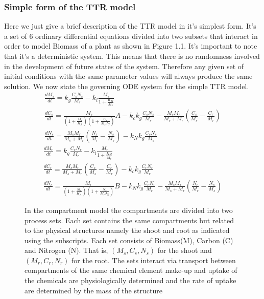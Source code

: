 \documentclass[paper=a4, fontsize=11pt]{scrartcl}
\numberwithin{equation}{section}		%
\numberwithin{figure}{section}			%
\numberwithin{table}{section}				%
\begin{document}
\subsubsection{Simple form of the TTR model}
Here we just give a brief description of the TTR model in it's simplest form. It's a set of 6 ordinary differential equations divided into two subsets that interact in order to model Biomass of a plant as shown in Figure 1.1. It's important to note that it's a deterministic system. This means that there is no randomness involved in the development of future states of the system. Therefore any given set of initial conditions with the same parameter values will always produce the same solution. We now state the governing ODE system for the simple TTR model. 
\begin{align}
	\frac{d M_s}{d t} = k_g \frac{C_s N_s}{M_s} - k_l \frac{M_s}{1 + \frac{K_M}{M_s}}  \\
    \frac{d C_s}{d t} = \frac{ M_s}{(1 + \frac{M_s}{K_A})(1 + \frac{C_s}{M_s J_C})} A - k_ck_g \frac{C_s N_s}{M_s} - \frac{M_s M_r}{M_s + M_r}(\frac{C_s}{M_s} - \frac{C_r}{M_r})\\
    \frac{d N_s}{d t} =\frac{M_s M_r}{M_s + M_r}(\frac{N_r}{M_r} - \frac{N_s}{M_s}) - k_N k_g \frac{C_s N_s}{M_s}
\end{align}
\begin{align}
	\frac{d M_r}{d t} = k_g \frac{C_r N_r}{M_r} - k_l \frac{M_r}{1 + \frac{K_M}{M_r}} \\
    \frac{d C_r}{d t} = \frac{M_s M_r}{M_s + M_r}(\frac{C_s}{M_s} - \frac{C_r}{M_r}) - k_c k_g \frac{C_r N_r}{M_r}\\
    \frac{d N_r}{d t} = \frac{M_r}{(1 + \frac{M_r}{K_A})(1 + \frac{N_r}{M_r J_N})} B - k_N k_g \frac{C_r N_r}{M_r} - \frac{M_s M_r}{M_s + M_r}(\frac{N_r}{M_r} - \frac{N_s}{M_s }) \label{ODE-TTR}
\end{align}
\begin{center}
\begin{figure}[h]
\centering

 \label{TTRdiagram-poes}
 \caption{In the compartment model the compartments are divided into two process sets. Each set contains the same compartments but related to the physical structures namely the shoot and root as indicated using the subscripts. Each set consists of Biomass(M), Carbon (C) and Nitrogen (N). That is, $(M_s,C_s,N_s)$ for the shoot and $(M_r,C_r,N_r)$ for the root. The sets interact via transport between compartments of the same chemical element make-up and uptake of the chemicals are physiologically determined and the rate of uptake are determined by the mass of the structure}
\end{figure}
	\end{center}
\end{document}

